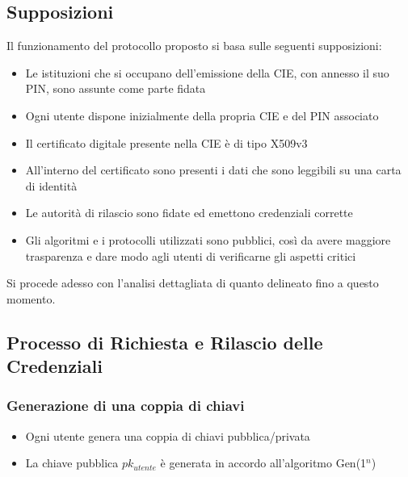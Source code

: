         \subsection{Supposizioni}
            Il funzionamento del protocollo proposto si basa sulle seguenti supposizioni:

            \begin{itemize}
                \item Le istituzioni che si occupano dell'emissione della CIE, con annesso il suo PIN, sono assunte come parte fidata
            
                \item Ogni utente dispone inizialmente della propria CIE e del PIN associato

                \item Il certificato digitale presente nella CIE è di tipo X509v3
                
                \item All'interno del certificato sono presenti i dati che sono leggibili su una carta di identità

                \item Le autorità di rilascio sono fidate ed emettono credenziali corrette

                \item Gli algoritmi e i protocolli utilizzati sono pubblici, così da avere maggiore trasparenza e dare modo agli utenti di verificarne gli aspetti critici
            \end{itemize}

            \noindent Si procede adesso con l’analisi dettagliata di quanto delineato fino a questo momento.

        \subsection{Processo di Richiesta e Rilascio delle Credenziali}
            
            \subsubsection{Generazione di una coppia di chiavi}
                \begin{itemize}
                    \item Ogni utente genera una coppia di chiavi pubblica/privata
    
                    \item La chiave pubblica $pk_{utente}$ è generata in accordo all'algoritmo Gen(1$^n$)
                \end{itemize}
            
